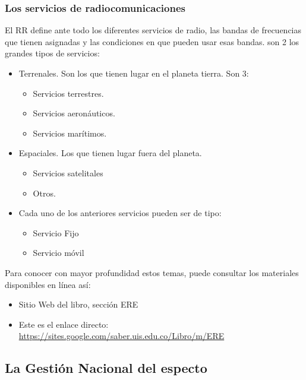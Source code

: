 \subsubsection{Los servicios de radiocomunicaciones}

El RR define ante todo los diferentes servicios de radio, las bandas de frecuencias que tienen asignadas y las condiciones en que pueden usar esas bandas. son 2 los grandes tipos de servicios:
    
\begin{itemize}
	\item   Terrenales. Son los que tienen lugar en el planeta tierra. Son 3:
    
    \begin{itemize}
	    \item  Servicios terrestres.
        \item  Servicios aeronáuticos.
        \item  Servicios marítimos.
    \end{itemize}
    
    \item  Espaciales. Los que tienen lugar fuera del planeta.
    
    	\begin{itemize}
	    	\item  Servicios satelitales
        	\item  Otros.
    	\end{itemize}
 
 	\item  Cada uno de los anteriores servicios pueden ser de tipo:
		\begin{itemize}
			\item  Servicio Fijo
    		\item  Servicio móvil
		\end{itemize}
\end{itemize}        

Para conocer con mayor profundidad estos temas, puede consultar los materiales disponibles en línea así:
\begin{itemize}
	\item   Sitio Web del libro, sección ERE 
	\item  Este es el enlace directo:
	\url{https://sites.google.com/saber.uis.edu.co/Libro/m/ERE}
\end{itemize}

\subsection{La Gestión Nacional del especto}

